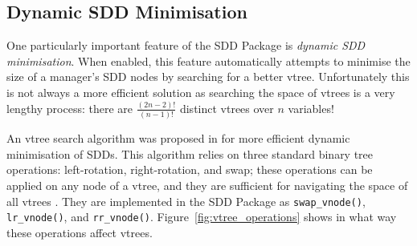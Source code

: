 \documentclass[11pt]{report}
\begin{document}
\subsection{Dynamic SDD Minimisation}
\label{sdd_dao_algo}
One particularly important feature of the SDD Package is \textit{dynamic SDD minimisation}. When enabled, this feature automatically attempts to minimise the size of a manager's SDD nodes by searching for a better vtree. Unfortunately this is not always a more efficient solution as searching the space of vtrees is a very lengthy process: there are $\frac{(2n -2)!}{(n-1)!}$ distinct vtrees over $n$ variables!

An vtree search algorithm was proposed in \cite{sdd_3} for more efficient dynamic minimisation of SDDs. This algorithm relies on three standard binary tree operations: left-rotation, right-rotation, and swap; these operations can be applied on any node of a vtree, and they are sufficient for navigating the space of all vtrees \cite{knuth}. They are implemented in the SDD Package as \texttt{swap\_vnode()}, \texttt{lr\_vnode()}, and \texttt{rr\_vnode()}. Figure~\ref{fig:vtree_operations} shows in what way these operations affect vtrees.
\end{document}
